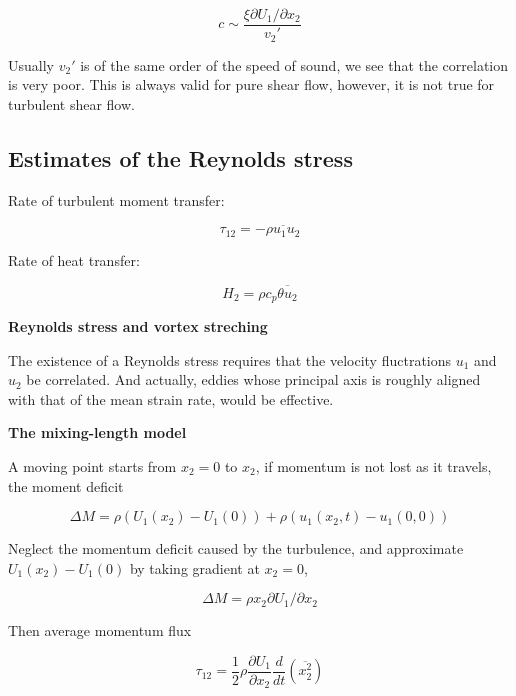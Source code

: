 \documentclass{article}
\begin{document}
\begin{equation*}
    c\sim\frac{\xi\partial U_1/\partial x_2}{v_2'}
\end{equation*}

Usually $v_2'$ is of the same order of the speed of sound, we see that the correlation is very poor. This is always valid for pure shear flow, however, it is not true for turbulent shear flow.


\subsection{Estimates of the Reynolds stress}

Rate of turbulent moment transfer:

\begin{equation*}
    \tau_{12}=-\overline{\rho u_1 u_2}
\end{equation*}

Rate of heat transfer:

\begin{equation*}
    H_2=\rho c_p \overline{\theta u_2}
\end{equation*}

\textbf{Reynolds stress and vortex streching}

The existence of a Reynolds stress requires that the velocity fluctrations $u_1$ and $u_2$ be correlated.
And actually, eddies whose principal axis is roughly aligned with that of the mean strain rate, would be effective.

\textbf{The mixing-length model}

A moving point starts from $x_2=0$ to $x_2$, if momentum is not lost as it travels, the moment deficit

\begin{equation*}
    \Delta M=\rho\left(U_1(x_2)-U_1(0)\right)+\rho\left(u_1(x_2,t)-u_1(0,0)\right)
\end{equation*}

Neglect the momentum deficit caused by the turbulence, and approximate $U_1(x_2)-U_1(0)$ by taking gradient at $x_2=0$,

\begin{equation*}
    \Delta M=\rho x_2 \partial U_1/\partial x_2
\end{equation*}

Then average momentum flux

\begin{equation*}
    \tau_{12}=\frac{1}{2}\rho\frac{\partial U_1}{\partial x_2}\frac{d}{dt}\left(\overline{x_2^2}\right)
\end{equation*}
\end{document}
